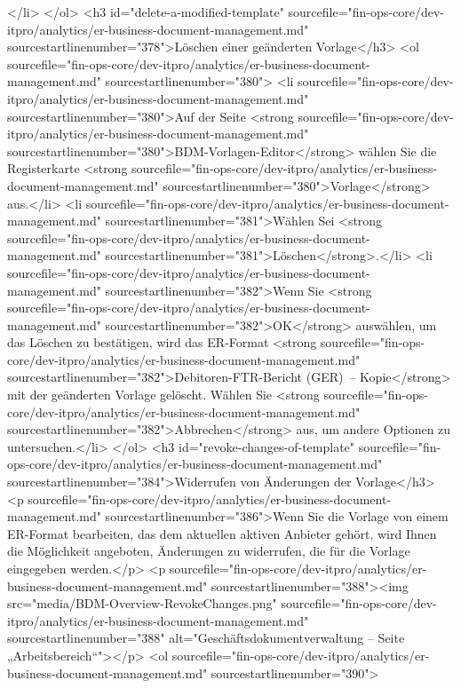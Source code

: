 </li>
</ol>
<h3 id="delete-a-modified-template" sourcefile="fin-ops-core/dev-itpro/analytics/er-business-document-management.md" sourcestartlinenumber="378">Löschen einer geänderten Vorlage</h3>
<ol sourcefile="fin-ops-core/dev-itpro/analytics/er-business-document-management.md" sourcestartlinenumber="380">
<li sourcefile="fin-ops-core/dev-itpro/analytics/er-business-document-management.md" sourcestartlinenumber="380">Auf der Seite <strong sourcefile="fin-ops-core/dev-itpro/analytics/er-business-document-management.md" sourcestartlinenumber="380">BDM-Vorlagen-Editor</strong> wählen Sie die Registerkarte <strong sourcefile="fin-ops-core/dev-itpro/analytics/er-business-document-management.md" sourcestartlinenumber="380">Vorlage</strong> aus.</li>
<li sourcefile="fin-ops-core/dev-itpro/analytics/er-business-document-management.md" sourcestartlinenumber="381">Wählen Sei <strong sourcefile="fin-ops-core/dev-itpro/analytics/er-business-document-management.md" sourcestartlinenumber="381">Löschen</strong>.</li>
<li sourcefile="fin-ops-core/dev-itpro/analytics/er-business-document-management.md" sourcestartlinenumber="382">Wenn Sie <strong sourcefile="fin-ops-core/dev-itpro/analytics/er-business-document-management.md" sourcestartlinenumber="382">OK</strong> auswählen, um das Löschen zu bestätigen, wird das ER-Format <strong sourcefile="fin-ops-core/dev-itpro/analytics/er-business-document-management.md" sourcestartlinenumber="382">Debitoren-FTR-Bericht (GER) – Kopie</strong> mit der geänderten Vorlage gelöscht. Wählen Sie <strong sourcefile="fin-ops-core/dev-itpro/analytics/er-business-document-management.md" sourcestartlinenumber="382">Abbrechen</strong> aus, um andere Optionen zu untersuchen.</li>
</ol>
<h3 id="revoke-changes-of-template" sourcefile="fin-ops-core/dev-itpro/analytics/er-business-document-management.md" sourcestartlinenumber="384">Widerrufen von Änderungen der Vorlage</h3>
<p sourcefile="fin-ops-core/dev-itpro/analytics/er-business-document-management.md" sourcestartlinenumber="386">Wenn Sie die Vorlage von einem ER-Format bearbeiten, das dem aktuellen aktiven Anbieter gehört, wird Ihnen die Möglichkeit angeboten, Änderungen zu widerrufen, die für die Vorlage eingegeben werden.</p>
<p sourcefile="fin-ops-core/dev-itpro/analytics/er-business-document-management.md" sourcestartlinenumber="388"><img src="media/BDM-Overview-RevokeChanges.png" sourcefile="fin-ops-core/dev-itpro/analytics/er-business-document-management.md" sourcestartlinenumber="388" alt="Geschäftsdokumentverwaltung – Seite „Arbeitsbereich“"></p>
<ol sourcefile="fin-ops-core/dev-itpro/analytics/er-business-document-management.md" sourcestartlinenumber="390">
